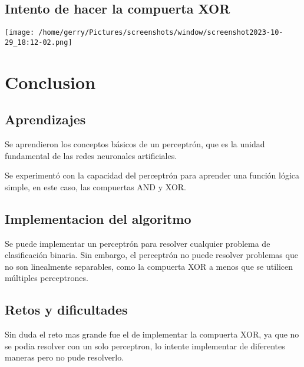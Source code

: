 \documentclass{article}
\begin{document}
\subsection{Intento de hacer la compuerta XOR}
\begin{center}
    \texttt{[image: /home/gerry/Pictures/screenshots/window/screenshot2023-10-29\_18:12-02.png]}
\end{center}

\section{Conclusion}
\subsection{Aprendizajes}
Se aprendieron los conceptos básicos de un perceptrón, que es la unidad fundamental de las redes neuronales artificiales.

Se experimentó con la capacidad del perceptrón para aprender una función lógica simple, en este caso, las compuertas AND y XOR.
\subsection{Implementacion del algoritmo}
Se puede implementar un perceptrón para resolver cualquier problema de clasificación binaria.
Sin embargo, el perceptrón no puede resolver problemas que no son linealmente separables,
como la compuerta XOR a menos que se utilicen múltiples perceptrones.
\subsection{Retos y dificultades}
Sin duda el reto mas grande fue el de implementar la compuerta XOR, ya que no se podia resolver
con un solo perceptron, lo intente implementar de diferentes maneras pero no pude resolverlo.
\end{document}
